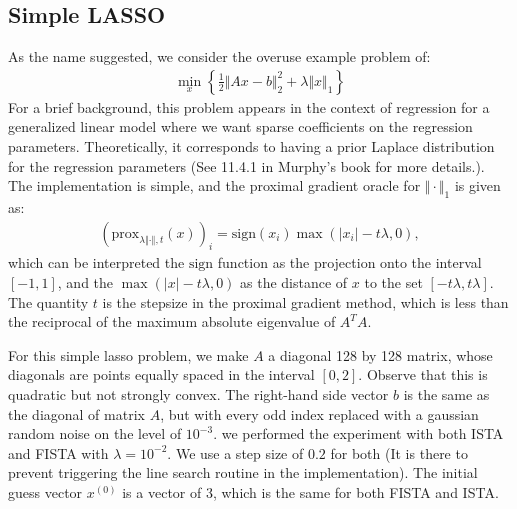 \documentclass[]{article}
\theoremstyle{definition}
\begin{document}
    \subsection*{Simple LASSO}
        As the name suggested, we consider the overuse example problem of: 
        \begin{align*}
            \min_{x}\left\lbrace
                \frac{1}{2}\Vert Ax - b\Vert^2_2 + \lambda\Vert x\Vert_1    
            \right\rbrace
        \end{align*}
        For a brief background, this problem appears in the context of regression for a generalized linear model where we want sparse coefficients on the regression parameters. Theoretically, it corresponds to having a prior Laplace distribution for the regression parameters (See 11.4.1 in Murphy's\cite{book:ml_prob_murphy} book for more details.). The implementation is simple, and the proximal gradient oracle for $\Vert \cdot \Vert_1$ is given as: 
        \begin{align*}
           (\text{prox}_{\lambda\Vert \cdot \Vert, t}(x))_i
           = 
           \text{sign}(x_i)\max(|x_i| - t\lambda, 0), 
        \end{align*}
        which can be interpreted the $\text{sign}$ function as the projection onto the interval $[-1, 1]$, and the $\max(|x| - t\lambda, 0)$ as the distance of $x$ to the set $[-t\lambda, t\lambda]$. The quantity $t$ is the stepsize in the proximal gradient method, which is less than the reciprocal of the maximum absolute eigenvalue of $A^TA$. 
        \par
        For this simple lasso problem, we make $A$ a diagonal 128 by 128 matrix, whose diagonals are points equally spaced in the interval $[0, 2]$. Observe that this is quadratic but not strongly convex. The right-hand side vector $b$ is the same as the diagonal of matrix $A$, but with every odd index replaced with a gaussian random noise on the level of $10^{-3}$. we performed the experiment with both ISTA and FISTA with $\lambda = 10^{-2}$. We use a step size of $0.2$ for both (It is there to prevent triggering the line search routine in the implementation). The initial guess vector $x^{(0)}$ is a vector of 3, which is the same for both FISTA and ISTA. 
        \par
\end{document}

